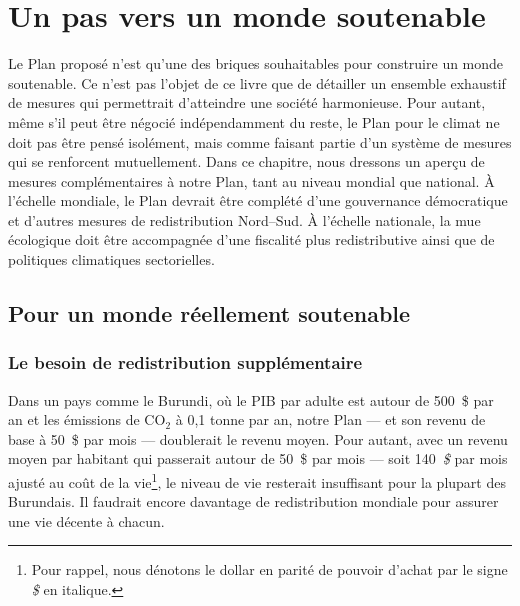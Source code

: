 \documentclass[a5paper,french,openany]{memoir}
\begin{document}

\chapter{Un pas vers un monde soutenable\label{ch:premier_pas}} %

Le Plan proposé n'est qu'une des briques souhaitables pour construire un monde soutenable. Ce n'est pas l'objet de ce livre que de détailler un ensemble exhaustif de mesures qui permettrait d'atteindre une société harmonieuse. Pour autant, même s'il peut être négocié indépendamment du reste, le Plan pour le climat ne doit pas être pensé isolément, mais comme faisant partie d'un système de mesures qui se renforcent mutuellement. Dans ce chapitre, nous dressons un aperçu de mesures complémentaires à notre Plan, tant au niveau mondial que national. À l'échelle mondiale, le Plan devrait être complété d'une gouvernance démocratique et d'autres mesures de redistribution Nord--Sud. À l'échelle nationale, la mue écologique doit être accompagnée d'une fiscalité plus redistributive ainsi que de politiques climatiques sectorielles. 

\section{Pour un monde réellement soutenable}

\subsection{Le besoin de redistribution supplémentaire}
Dans un pays comme le Burundi, où le PIB par adulte est autour de 500~\$ par an et les émissions de CO$_\text{2}$ à 0,1 tonne par an, notre Plan --- et son revenu de base à 50~\$ par mois --- doublerait le revenu moyen. 
Pour autant, avec un revenu moyen par habitant qui passerait autour de 50~\$ par mois --- soit 140~\textit{\$} par mois ajusté au coût de la vie\footnote{Pour rappel, nous dénotons le dollar en parité de pouvoir d'achat par le signe \textit{\$} en italique.}, 
le niveau de vie resterait insuffisant pour la plupart des Burundais. Il faudrait encore davantage de redistribution mondiale pour assurer une vie décente à chacun. 
\end{document}

